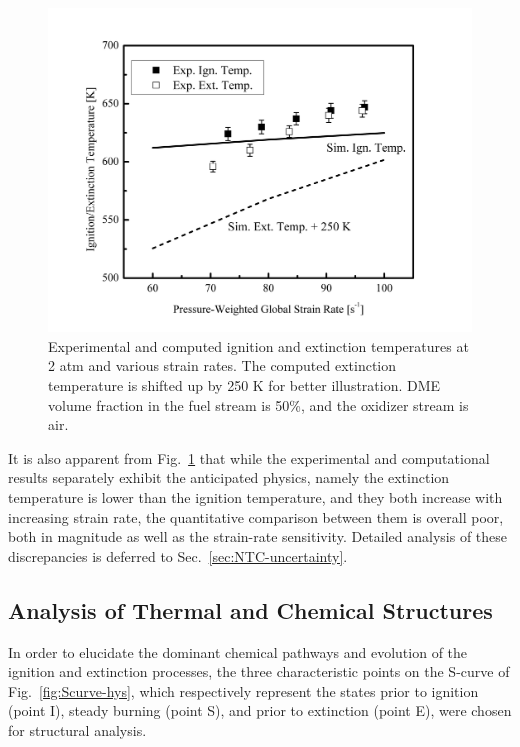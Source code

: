 \begin{figure}[t]
  \centering
  \scriptsize
  \includegraphics[width=1.0\textwidth]{ch-NTC/cmp_demo.png}
  \normalsize
  \caption{Experimental and computed ignition and extinction temperatures at 2 atm and various strain rates.  The computed extinction temperature is shifted up by 250 K for better illustration.  DME volume fraction in the fuel stream is 50\%, and the oxidizer stream is air.}
  \label{fig:cmp_demo}
\end{figure}

It is also apparent from Fig.~\ref{fig:cmp_demo} that while the experimental and computational results separately exhibit the anticipated physics, namely the extinction temperature is lower than the ignition temperature, and they both increase with increasing strain rate, the quantitative comparison between them is overall poor, both in magnitude as well as the strain-rate sensitivity. Detailed analysis of these discrepancies is deferred to Sec.~\ref{sec:NTC-uncertainty}. 


\subsection{Analysis of Thermal and Chemical Structures}\label{sec:NTC-structure}

In order to elucidate the dominant chemical pathways and evolution of the ignition and extinction processes, the three characteristic points on the S-curve of Fig.~\ref{fig:Scurve-hys}, which respectively represent the states prior to ignition (point I), steady burning (point S), and prior to extinction (point E), were chosen for structural analysis.

